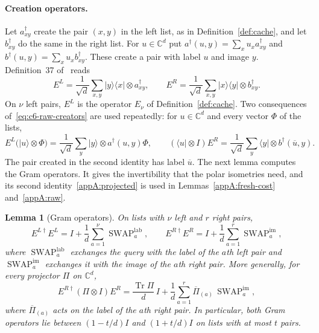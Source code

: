 \documentclass[11pt,letterpaper]{article}
\newtheorem{lemma}[theorem]{Lemma}
\theoremstyle{definition}\newtheorem{definition}[theorem]{Definition}
\newcommand{\C}{\mathbb C}
\newcommand{\Tr}{\operatorname{Tr}}
\newcommand{\ket}[1]{\lvert#1\rangle}
\newcommand{\bra}[1]{\langle#1\rvert}
\begin{document}
\paragraph{Creation operators.}
Let $a^\dagger_{xy}$ create the pair $(x,y)$ in the left list, as in
Definition~\ref{def:cache}, and let $b^\dagger_{xy}$ do the same in
the right list. For $u\in\C^d$ put
$a^\dagger(u,y)=\sum_xu_xa^\dagger_{xy}$ and
$b^\dagger(u,y)=\sum_xu_xb^\dagger_{xy}$. These create a pair with
label $u$ and image $y$. Definition~37 of~\cite{mahuang2025} reads
\begin{equation}\label{eq:c6-raw-creators}
 E^L=\frac1{\sqrt d}\sum_{x,y}\ket y\bra x\otimes a_{xy}^\dagger,
 \qquad
 E^R=\frac1{\sqrt d}\sum_{x,y}\ket x\bra y\otimes b_{xy}^\dagger .
\end{equation}
On $\nu$ left pairs, $E^L$ is the operator $E_\nu$ of
Definition~\ref{def:cache}. Two consequences
of~\eqref{eq:c6-raw-creators} are used repeatedly: for $u\in\C^d$ and
every vector $\Phi$ of the lists,
\begin{equation}\label{appA:action}
 E^L\bigl(\ket u\otimes\Phi\bigr)
 =\frac1{\sqrt d}\sum_y\ket y\otimes a^\dagger(u,y)\Phi,
 \qquad
 (\bra u\otimes I)E^R
 =\frac1{\sqrt d}\sum_y\bra y\otimes b^\dagger(\overline u,y).
\end{equation}
The pair created in the second identity has label $\overline u$. The
next lemma computes the Gram operators. It gives the invertibility that
the polar isometries need, and its second
identity~\eqref{appA:projected} is used in
Lemmas~\ref{appA:fresh-cost} and~\ref{appA:raw}.

\begin{lemma}[Gram operators]\label{appA:gram}
On lists with $\nu$ left and $r$ right pairs,
\begin{equation}\label{eq:c6-grams}
 E^{L\dagger}E^L=I+\frac1d\sum_{a=1}^{\nu}
                    \operatorname{SWAP}^{\mathrm{lab}}_a,
 \qquad
 E^{R\dagger}E^R=I+\frac1d\sum_{a=1}^{r}
                    \operatorname{SWAP}^{\mathrm{im}}_a ,
\end{equation}
where $\operatorname{SWAP}^{\mathrm{lab}}_a$ exchanges the query with
the label of the $a$th left pair and
$\operatorname{SWAP}^{\mathrm{im}}_a$ exchanges it with the image of
the $a$th right pair. More generally, for every projector $\Pi$ on
$\C^d$,
\begin{equation}\label{appA:projected}
 E^{R\dagger}(\Pi\otimes I)E^R=\frac{\Tr\Pi}{d}\,I
 +\frac1d\sum_{a=1}^{r}\overline\Pi_{(a)}\,
   \operatorname{SWAP}^{\mathrm{im}}_a ,
\end{equation}
where $\overline\Pi_{(a)}$ acts on the label of the $a$th right pair.
In particular, both Gram operators lie between $(1-t/d)I$ and
$(1+t/d)I$ on lists with at most $t$ pairs.
\end{lemma}
\end{document}
